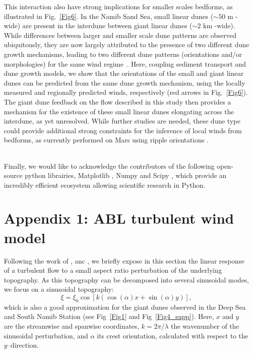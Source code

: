  This interaction also have strong implications for smaller scales bedforms, as illustrated in Fig.~\ref{Fig6}. In the Namib Sand Sea, small linear dunes ($\sim 50$ m -wide) are present in the interdune between giant linear dunes ($\sim 2$ km -wide). While differences between larger and smaller scale dune patterns are observed ubiquitously, they are now largely attributed to the presence of two different dune growth mechanisms, leading to two different dune patterns (orientations and/or morphologies) for the same wind regime~\citep{Courrech2014, Runyon2017, lu2017, Song2019, Hu2021}. Here, coupling sediment transport and dune growth models, we show that the orientations of the small and giant linear dunes can be predicted from the same dune growth mechanism, using the locally measured and regionally predicted winds, respectively (red arrows in Fig.~\ref{Fig6}). The giant dune feedback on the flow described in this study then provides a mechanism for the existence of these small linear dunes elongating across the interdune, as yet unresolved. While further studies are needed, these dune type could provide additional strong constraints for the inference of local winds from bedforms, as currently performed on Mars using ripple orientations \citep{Liu2015, Hood2021}.


\begin{acknowledgements}
\\
Finally, we would like to acknowledge the contributors of the following open-source python librairies, Matplotlib \citep{Hunter2007}, Numpy \citep{Harris2020} and Scipy \citep{Virtanen2020}, which provide an incredibly efficient ecosystem allowing scientific research in Python.
\end{acknowledgements}

\section*{Appendix 1: ABL turbulent wind model}
\label{turbulent_wind_model}

Following the work of \citet{Fourriere2010}, \citet{Andreotti2012} anc \citet{andreotti2009}, we briefly expose in this section the linear response of a turbulent flow to a small aspect ratio perturbation of the underlying topography. As this topography can be decomposed into several sinusoidal modes, we focus on a sinusoidal topography:
\begin{equation}
  \xi = \xi_{0}\cos\left[k\left(\cos(\alpha)x + \sin(\alpha)y\right)\right],
\end{equation}
which is also a good approximation for the giant dunes observed in the Deep Sea and South Namib Station (see Fig~\ref{Fig1} and Fig~\ref{Fig4_supp}). Here, $x$ and $y$ are the streamwise and spanwise coordinates, $k=2\pi/\lambda$ the wavenumber of the sinusoidal perturbation, and $\alpha$ its crest orientation, calculated with respect to the $y$--direction.

